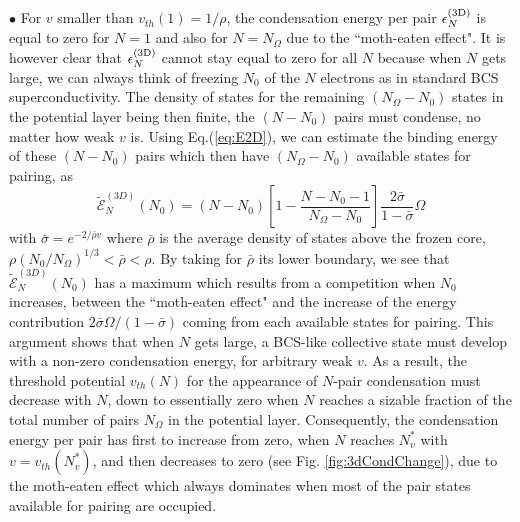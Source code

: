 \documentclass[5p,twocolumn]{elsarticle}
\begin{document}
$\bullet$ For $v$ smaller than $v_{th}(1)=1/\rho$, the condensation energy per pair $\epsilon_N^{{\text{(3D)}}}$ is equal to zero for $N=1$ and also for $N=N_\Omega$ due to the ``moth-eaten effect".  It is however clear that $\epsilon_N^{{\text{(3D)}}}$ cannot stay equal to zero for all $N$ because when $N$ gets large, we can always think of freezing $N_0$ of the $N$ electrons as in standard BCS superconductivity. The density of states for the remaining $(N_\Omega - N_0)$ states in the potential layer being then finite, the $(N-N_0)$ pairs must condense, no matter how weak $v$ is.  Using Eq.(\ref{eq:E2D}),
 we can estimate the binding energy of these $(N-N_0)$ pairs which then have $(N_\Omega - N_0)$ available states for pairing, as
\begin{equation}\label{eq:E3D}
\widetilde{\mathcal{E}}_N^{(3D)}(N_0)=(N-N_0)\left[1-\frac{N-N_0-1}{N_\Omega-N_0}\right]\frac{2\bar\sigma}{1-\bar\sigma}\Omega
\end{equation}
with $\bar{\sigma}=e^{-2/{\bar{\rho}v}}$ where $\bar\rho$ is the average density of states above the frozen core, $\rho(N_0/N_\Omega)^{ 1/3}<\bar\rho<\rho$. By taking for  $\bar\rho$ its lower boundary, we see that $\widetilde{\mathcal{E}}_N^{(3D)}(N_0)$ has a maximum which results from a competition when $N_0$ increases, between the ``moth-eaten effect" and the increase of the energy contribution $2\bar\sigma\Omega/(1-\bar\sigma)$ coming from each available states for pairing.
This argument shows that when $N$ gets large, a BCS-like collective state must develop with a non-zero condensation energy, for arbitrary weak $v$. 
As a result, the threshold potential  $v_{th}(N)$ for the appearance of $N$-pair condensation  must decrease with $N$, down to essentially zero when $N$ reaches a sizable fraction of the total number of pairs $N_\Omega$ in the potential layer.  Consequently, the condensation energy per pair has first to increase from zero, when $N$ reaches $N_v^*$ with $v=v_{th}(N_v^*)$, and then decreases to zero (see Fig. \ref{fig:3dCondChange}), due to the moth-eaten effect which always dominates when most of the pair states available for pairing are occupied. 


\end{document}
